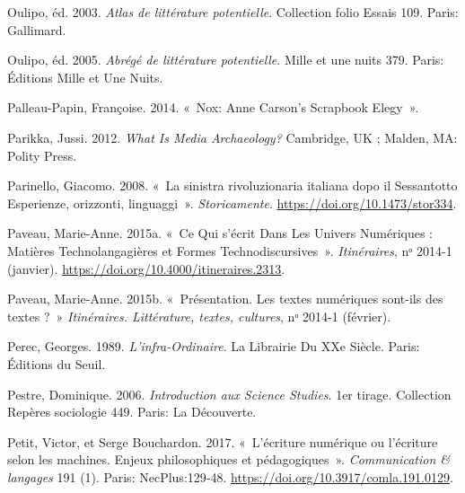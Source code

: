 \begin{CSLReferences}{1}{0}
\leavevmode{}%
Oulipo, éd. 2003. \emph{{Atlas de litt{é}rature potentielle}}.
{Collection folio Essais} 109. {Paris}: {Gallimard}.

\leavevmode{}%
Oulipo, éd. 2005. \emph{{Abr{é}g{é} de litt{é}rature potentielle}}.
{Mille et une nuits} 379. {Paris}: {{É}ditions Mille et Une Nuits}.

\leavevmode{}%
Palleau-Papin, Françoise. 2014. {«~Nox: {Anne Carson}'s {Scrapbook
Elegy}~»}.

\leavevmode{}%
Parikka, Jussi. 2012. \emph{What {Is Media Archaeology}?} {Cambridge, UK
; Malden, MA}: {Polity Press}.

\leavevmode{}%
Parinello, Giacomo. 2008. {«~{La sinistra rivoluzionaria italiana dopo
il Sessantotto Esperienze, orizzonti, linguaggi}~»}.
\emph{Storicamente}. \url{https://doi.org/10.1473/stor334}.

\leavevmode{}%
Paveau, Marie-Anne. 2015a. {«~Ce Qui s'{é}crit Dans Les Univers
Num{é}riques : {Mati{è}res} Technolangagi{è}res et Formes
Technodiscursives~»}. \emph{Itin{é}raires}, nᵒ 2014-1 (janvier).
\url{https://doi.org/10.4000/itineraires.2313}.

\leavevmode{}%
Paveau, Marie-Anne. 2015b. {«~{Pr{é}sentation. Les textes num{é}riques
sont-ils des textes ?}~»} \emph{Itin{é}raires. Litt{é}rature, textes,
cultures}, nᵒ 2014-1 (février).

\leavevmode{}%
Perec, Georges. 1989. \emph{L'infra-Ordinaire}. La {Librairie} Du {XXe}
Si{è}cle. {Paris}: {{É}ditions du Seuil}.

\leavevmode{}%
Pestre, Dominique. 2006. \emph{{Introduction aux Science Studies}}. 1er
tirage. {Collection Rep{è}res sociologie} 449. {Paris}: {La
D{é}couverte}.

\leavevmode{}%
Petit, Victor, et Serge Bouchardon. 2017. {«~{L'{é}criture num{é}rique
ou l'{é}criture selon les machines. Enjeux philosophiques et
p{é}dagogiques}~»}. \emph{Communication \& langages} 191 (1). {Paris}:
{NecPlus}:129‑48. \url{https://doi.org/10.3917/comla.191.0129}.


\end{CSLReferences}
